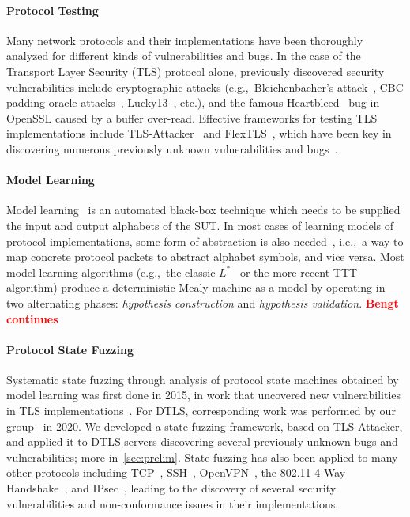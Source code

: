 \documentclass[11pt]{article}
\newcommand{\FIX}[1]{\textcolor{red}{\textbf{#1}}}
\newcommand{\system}[1]{\mbox{\textsf{#1}}}
\newcommand{\myparagraph}{}
\let\myparagraph=\paragraph
\renewcommand{\paragraph}{\vspace{-3mm}\myparagraph}
\newcommand{\eg}{e.\/g.,\ }
\newcommand{\ie}{i.\/e.,\ }
\begin{document}
\paragraph{Protocol Testing}
Many network protocols and their implementations have been thoroughly analyzed
for different kinds of vulnerabilities and bugs.  In the case of the Transport
Layer Security (TLS) protocol alone, previously discovered security
vulnerabilities include cryptographic attacks (\eg Bleichenbacher's
attack~\cite{Bleichenbacher1998}, CBC padding oracle
attacks~\cite{Vaudenay:CBCWeaknesses:02}, Lucky13~\cite{Lucky13@SP-13}, etc.),
and the famous Heartbleed~\cite{heartbleed} bug in OpenSSL caused by a buffer
over-read.
%
Effective frameworks for testing TLS implementations include
\system{TLS-Attacker}~\cite{somorovsky2016} and
\system{FlexTLS}~\cite{FlexTLS@WOOT-15}, which have been key in discovering
numerous previously unknown vulnerabilities and bugs~\cite{MessyTLS@CACM-17}.

\paragraph{Model Learning}
Model learning~\cite{Vaandrager@CACM-17} is an automated black-box technique
which needs to be supplied the input and output alphabets of the SUT.  In most
cases of learning models of protocol implementations, some form of abstraction
is also needed~\cite{AJUV15}, \ie a way to map concrete protocol packets to
abstract alphabet symbols, and vice versa.
%
Most model learning algorithms (\eg the classic $L^*$~\cite{Angluin1987} or
the more recent TTT~\cite{IHS2014} algorithm)
produce a deterministic Mealy machine as a model by operating in two alternating
phases: \emph{hypothesis construction} and \emph{hypothesis validation}.
%
\FIX{Bengt continues}

\paragraph{Protocol State Fuzzing}
Systematic state fuzzing through analysis of protocol state machines obtained
by model learning was first done in 2015, in work that uncovered new
vulnerabilities in TLS implementations~\cite{ruiter2015}.
%
For DTLS, corresponding work was performed by our group~\cite{DTLS@USENIX-20}
in 2020.  We developed a state fuzzing framework,
based on \system{TLS-Attacker}, and applied it to DTLS servers discovering
several previously unknown bugs and vulnerabilities; more in~\cref{sec:prelim}.
%
State fuzzing has also been applied to many other protocols including
TCP~\cite{FJV2016}, SSH~\cite{SSH@SPIN-2017},
OpenVPN~\cite{OpenVPN@EuroSPW-2018}, the 802.11 4-Way
Handshake~\cite{stone2018}, and IPsec~\cite{guo2019model}, leading to the
discovery of several security vulnerabilities and non-conformance issues in
their implementations.
%
\end{document}
